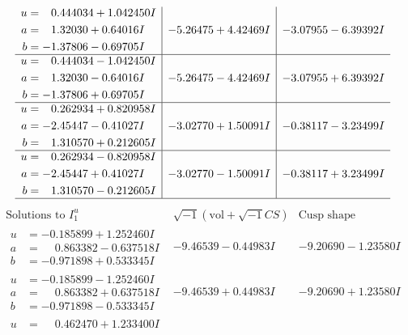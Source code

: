 \documentclass[1p]{elsarticle_modified}
\theoremstyle{definition}
\newcommand{\I}{\sqrt{-1}}
\begin{document}
$$\begin{array}{c|c|c}
\begin{aligned}
u &= \phantom{-}0.444034 + 1.042450 I \\
a &= \phantom{-}1.32030 + 0.64016 I \\
b &= -1.37806 - 0.69705 I\end{aligned}
 & -5.26475 + 4.42469 I & -3.07955 - 6.39392 I \\ \hline\begin{aligned}
u &= \phantom{-}0.444034 - 1.042450 I \\
a &= \phantom{-}1.32030 - 0.64016 I \\
b &= -1.37806 + 0.69705 I\end{aligned}
 & -5.26475 - 4.42469 I & -3.07955 + 6.39392 I \\ \hline\begin{aligned}
u &= \phantom{-}0.262934 + 0.820958 I \\
a &= -2.45447 - 0.41027 I \\
b &= \phantom{-}1.310570 + 0.212605 I\end{aligned}
 & -3.02770 + 1.50091 I & -0.38117 - 3.23499 I \\ \hline\begin{aligned}
u &= \phantom{-}0.262934 - 0.820958 I \\
a &= -2.45447 + 0.41027 I \\
b &= \phantom{-}1.310570 - 0.212605 I\end{aligned}
 & -3.02770 - 1.50091 I & -0.38117 + 3.23499 I\\
 \hline 
 \end{array}$$\newpage$$\begin{array}{c|c|c}  
\text{Solutions to }I^u_{1}& \I (\text{vol} + \sqrt{-1}CS) & \text{Cusp shape}\\
 \hline 
\begin{aligned}
u &= -0.185899 + 1.252460 I \\
a &= \phantom{-}0.863382 - 0.637518 I \\
b &= -0.971898 + 0.533345 I\end{aligned}
 & -9.46539 - 0.44983 I & -9.20690 - 1.23580 I \\ \hline\begin{aligned}
u &= -0.185899 - 1.252460 I \\
a &= \phantom{-}0.863382 + 0.637518 I \\
b &= -0.971898 - 0.533345 I\end{aligned}
 & -9.46539 + 0.44983 I & -9.20690 + 1.23580 I \\ \hline\begin{aligned}
u &= \phantom{-}0.462470 + 1.233400 I \\

\end{aligned}
\end{array}$$
\end{document}
